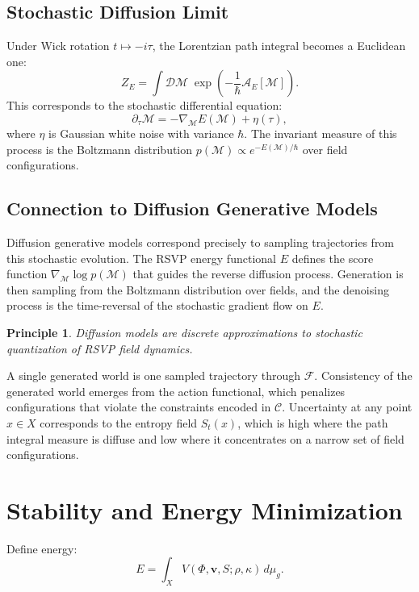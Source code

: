 \documentclass[11pt]{article}
\newtheorem{principle}{Principle}
\begin{document}
\subsection{Stochastic Diffusion Limit}

Under Wick rotation $t \mapsto -i\tau$, the Lorentzian path integral
becomes a Euclidean one:
\[
Z_E
=
\int \mathcal{D}\mathcal{M}\;
\exp\left(
-\frac{1}{\hbar} \mathcal{A}_E[\mathcal{M}]
\right).
\]
This corresponds to the stochastic differential equation:
\[
\partial_\tau \mathcal{M}
=
-\nabla_{\mathcal{M}} E(\mathcal{M})
+
\eta(\tau),
\]
where $\eta$ is Gaussian white noise with variance $\hbar$.
The invariant measure of this process is the Boltzmann distribution
$p(\mathcal{M}) \propto e^{-E(\mathcal{M})/\hbar}$ over field configurations.

\subsection{Connection to Diffusion Generative Models}

Diffusion generative models correspond precisely to sampling trajectories
from this stochastic evolution.
The RSVP energy functional $E$ defines the score function
$\nabla_{\mathcal{M}} \log p(\mathcal{M})$ that guides the reverse diffusion
process.
Generation is then sampling from the Boltzmann distribution over fields,
and the denoising process is the time-reversal of the stochastic gradient
flow on $E$.

\begin{principle}
Diffusion models are discrete approximations to stochastic quantization
of RSVP field dynamics.
\end{principle}

A single generated world is one sampled trajectory through $\mathcal{F}$.
Consistency of the generated world emerges from the action functional,
which penalizes configurations that violate the constraints encoded in
$\mathcal{C}$.
Uncertainty at any point $x \in X$ corresponds to the entropy field
$S_t(x)$, which is high where the path integral measure is diffuse and
low where it concentrates on a narrow set of field configurations.

\section{Stability and Energy Minimization}

Define energy:
\[
E = \int_X V(\Phi,\mathbf{v},S;\rho,\kappa)\, d\mu_g.
\]
\end{document}
